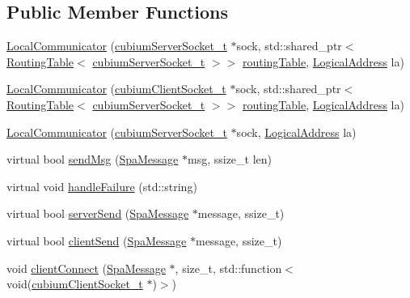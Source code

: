 \subsection*{Public Member Functions}
\begin{DoxyCompactItemize}
\item 
\hyperlink{classLocalCommunicator_a477260797392154cc43815852ced969c}{Local\+Communicator} (\hyperlink{structcubiumServerSocket__t}{cubium\+Server\+Socket\+\_\+t} $\ast$sock, std\+::shared\+\_\+ptr$<$ \hyperlink{classRoutingTable}{Routing\+Table}$<$ \hyperlink{structcubiumServerSocket__t}{cubium\+Server\+Socket\+\_\+t} $>$$>$ \hyperlink{classLocalCommunicator_ac28392070111396dabbadbbcb81a7ef7}{routing\+Table}, \hyperlink{structLogicalAddress}{Logical\+Address} la)
\item 
\hyperlink{classLocalCommunicator_ac5845882ec445ca5f3bedbaf666073c0}{Local\+Communicator} (\hyperlink{structcubiumClientSocket__t}{cubium\+Client\+Socket\+\_\+t} $\ast$sock, std\+::shared\+\_\+ptr$<$ \hyperlink{classRoutingTable}{Routing\+Table}$<$ \hyperlink{structcubiumServerSocket__t}{cubium\+Server\+Socket\+\_\+t} $>$$>$ \hyperlink{classLocalCommunicator_ac28392070111396dabbadbbcb81a7ef7}{routing\+Table}, \hyperlink{structLogicalAddress}{Logical\+Address} la)
\item 
\hyperlink{classLocalCommunicator_a22dbee26502e3ac2bdf46b9f094d881d}{Local\+Communicator} (\hyperlink{structcubiumServerSocket__t}{cubium\+Server\+Socket\+\_\+t} $\ast$sock, \hyperlink{structLogicalAddress}{Logical\+Address} la)
\item 
virtual bool \hyperlink{classLocalCommunicator_afb8fc8a82069dac7bf08f736fa76c4c8}{send\+Msg} (\hyperlink{structSpaMessage}{Spa\+Message} $\ast$msg, ssize\+\_\+t len)
\item 
virtual void \hyperlink{classLocalCommunicator_a0d6816af83fd55a79990f0b8caa4e164}{handle\+Failure} (std\+::string)
\item 
virtual bool \hyperlink{classLocalCommunicator_a6175c2c35727bb081c5f518e1750dd86}{server\+Send} (\hyperlink{structSpaMessage}{Spa\+Message} $\ast$message, ssize\+\_\+t)
\item 
virtual bool \hyperlink{classLocalCommunicator_afca7f865eda5dca2fc4c3bf5ca697ab8}{client\+Send} (\hyperlink{structSpaMessage}{Spa\+Message} $\ast$message, ssize\+\_\+t)
\item 
void \hyperlink{classLocalCommunicator_a4dc9ea76a7d6d1d363ec8b69c1d5d586}{client\+Connect} (\hyperlink{structSpaMessage}{Spa\+Message} $\ast$, size\+\_\+t, std\+::function$<$ void(\hyperlink{structcubiumClientSocket__t}{cubium\+Client\+Socket\+\_\+t} $\ast$)$>$)

\end{DoxyCompactItemize}
